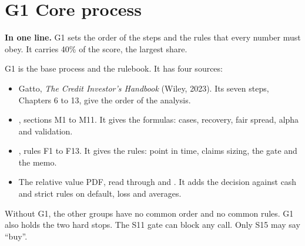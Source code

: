 
\newpage
\section*{\textcolor{gA}{G1} Core process}

\begin{notebox}
\textbf{In one line.} G1 sets the order of the steps and the rules that every number must obey. It carries 40\% of the score, the largest share.
\end{notebox}

G1 is the base process and the rulebook. It has four sources:
\begin{itemize}
\item Gatto, \emph{The Credit Investor's Handbook} (Wiley, 2023). Its seven steps, Chapters 6 to 13, give the order of the analysis.
\item {}, sections M1 to M11. It gives the formulas: cases, recovery, fair spread, alpha and validation.
\item {}, rules F1 to F13. It gives the rules: point in time, claims sizing, the gate and the memo.
\item The relative value PDF, read through  and . It adds the decision against cash and strict rules on default, loss and averages.
\end{itemize}

Without G1, the other groups have no common order and no common rules. G1 also holds the two hard stops. The S11 gate can block any call. Only S15 may say ``buy''.


